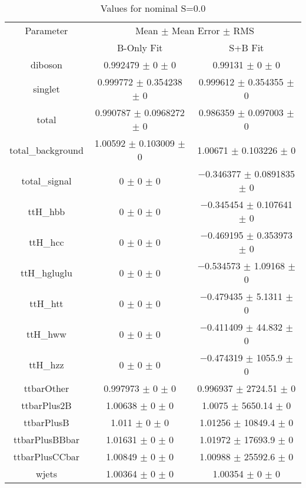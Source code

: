 \begin{table}
\centering
\caption{Values for nominal S=0.0}
\begin{tabular}{ccc}
\toprule
Parameter & \multicolumn{2}{c}{Mean $\pm$ Mean Error $\pm$ RMS}\\
 & B-Only Fit & S+B Fit\\
\midrule
diboson & \num{0.992479} $\pm$ \num{0} $\pm$ \num{0} & \num{0.99131} $\pm$ \num{0} $\pm$ \num{0}\\
singlet & \num{0.999772} $\pm$ \num{0.354238} $\pm$ \num{0} & \num{0.999612} $\pm$ \num{0.354355} $\pm$ \num{0}\\
total & \num{0.990787} $\pm$ \num{0.0968272} $\pm$ \num{0} & \num{0.986359} $\pm$ \num{0.097003} $\pm$ \num{0}\\
total\_background & \num{1.00592} $\pm$ \num{0.103009} $\pm$ \num{0} & \num{1.00671} $\pm$ \num{0.103226} $\pm$ \num{0}\\
total\_signal & \num{0} $\pm$ \num{0} $\pm$ \num{0} & \num{-0.346377} $\pm$ \num{0.0891835} $\pm$ \num{0}\\
ttH\_hbb & \num{0} $\pm$ \num{0} $\pm$ \num{0} & \num{-0.345454} $\pm$ \num{0.107641} $\pm$ \num{0}\\
ttH\_hcc & \num{0} $\pm$ \num{0} $\pm$ \num{0} & \num{-0.469195} $\pm$ \num{0.353973} $\pm$ \num{0}\\
ttH\_hgluglu & \num{0} $\pm$ \num{0} $\pm$ \num{0} & \num{-0.534573} $\pm$ \num{1.09168} $\pm$ \num{0}\\
ttH\_htt & \num{0} $\pm$ \num{0} $\pm$ \num{0} & \num{-0.479435} $\pm$ \num{5.1311} $\pm$ \num{0}\\
ttH\_hww & \num{0} $\pm$ \num{0} $\pm$ \num{0} & \num{-0.411409} $\pm$ \num{44.832} $\pm$ \num{0}\\
ttH\_hzz & \num{0} $\pm$ \num{0} $\pm$ \num{0} & \num{-0.474319} $\pm$ \num{1055.9} $\pm$ \num{0}\\
ttbarOther & \num{0.997973} $\pm$ \num{0} $\pm$ \num{0} & \num{0.996937} $\pm$ \num{2724.51} $\pm$ \num{0}\\
ttbarPlus2B & \num{1.00638} $\pm$ \num{0} $\pm$ \num{0} & \num{1.0075} $\pm$ \num{5650.14} $\pm$ \num{0}\\
ttbarPlusB & \num{1.011} $\pm$ \num{0} $\pm$ \num{0} & \num{1.01256} $\pm$ \num{10849.4} $\pm$ \num{0}\\
ttbarPlusBBbar & \num{1.01631} $\pm$ \num{0} $\pm$ \num{0} & \num{1.01972} $\pm$ \num{17693.9} $\pm$ \num{0}\\
ttbarPlusCCbar & \num{1.00849} $\pm$ \num{0} $\pm$ \num{0} & \num{1.00988} $\pm$ \num{25592.6} $\pm$ \num{0}\\
wjets & \num{1.00364} $\pm$ \num{0} $\pm$ \num{0} & \num{1.00354} $\pm$ \num{0} $\pm$ \num{0}\\
\bottomrule
\end{tabular}
\end{table}